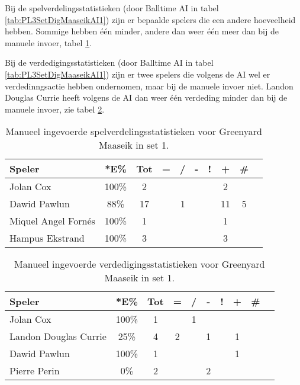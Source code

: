 Bij de spelverdelingsstatistieken (door Balltime AI in tabel \ref{tab:PL3SetDigMaaseikAI1}) zijn er bepaalde spelers die een andere hoeveelheid hebben. Sommige hebben één minder, andere dan weer één meer dan bij de manuele invoer, tabel \ref{tab:PL3SetMaaseikMan1}.

Bij de verdedigingsstatistieken (door Balltime AI in tabel \ref{tab:PL3SetDigMaaseikAI1}) zijn er twee spelers die volgens de AI wel er verdedinngsactie hebben ondernomen, maar bij de manuele invoer niet. Landon Douglas Currie heeft volgens de AI dan weer één verdeding minder dan bij de manuele invoer, zie tabel \ref{tab:PL3DigMaaseikMan1}.

\begin{table}[ht!]
    \centering
    \scriptsize
    \begin{tabular}{|l|c|c|c|c|c|c|c|c|c|} \hline
        \textbf{Speler} & *E\% & Tot & = & / & - & ! & + & \# \\ \hline
        Jolan Cox & 100\% & 2 &  &  &  &  & 2 &  \\ 
        Dawid Pawlun & 88\% & 17 &  & 1 &  &  & 11 & 5 \\ 
        Miquel Angel Fornés & 100\% & 1 &  &  &  &  & 1 &  \\ 
        Hampus Ekstrand & 100\% & 3 &  &  &  &  & 3 &  \\ \hline
    \end{tabular}
    \caption[Manueel ingevoerde spelverdelingsstatistieken voor Greenyard Maaseik in set 1]{\label{tab:PL3SetMaaseikMan1}Manueel ingevoerde spelverdelingsstatistieken voor Greenyard Maaseik in set 1.}
\end{table}

\begin{table}[ht!]
    \centering
    \scriptsize
    \begin{tabular}{|l|c|c|c|c|c|c|c|c|c|} \hline
        \textbf{Speler} & *E\% & Tot & = & / & - & ! & + & \# \\ \hline
        Jolan Cox & 100\% & 1 &  & 1 &  &  &  & \\
        Landon Douglas Currie & 25\% & 4 & 2 &  & 1 &  & 1 & \\ 
        Dawid Pawlun & 100\% & 1 &  &  &  &  & 1 & \\
        Pierre Perin & 0\% & 2 &  &  & 2 &  &  &  \\ \hline
    \end{tabular}
    \caption[Manueel ingevoerde verdedigingsstatistieken voor Greenyard Maaseik in set 1]{\label{tab:PL3DigMaaseikMan1}Manueel ingevoerde verdedigingsstatistieken voor Greenyard Maaseik in set 1.}
\end{table}

